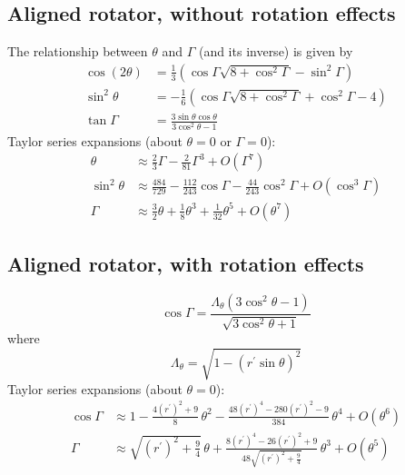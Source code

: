 \documentclass{book}
\begin{document}
\subsection{Aligned rotator, without rotation effects}
The relationship between $\theta$ and $\Gamma$ (and its inverse) is given by \citet{Gangadhara2004}
\begin{equation}
    \begin{aligned}
        \cos(2\theta) &= \frac13\left(\cos\Gamma\sqrt{8 + \cos^2\Gamma} - \sin^2\Gamma\right) \\
        \sin^2\theta  &= -\frac16\left(\cos\Gamma\sqrt{8 + \cos^2\Gamma} + \cos^2\Gamma - 4\right) \\
        \tan\Gamma &= \frac{3\sin\theta\cos\theta}{3\cos^2\theta - 1}
    \end{aligned}
\end{equation}
Taylor series expansions (about $\theta = 0$ or $\Gamma = 0$):
\begin{equation}
    \begin{aligned}
        \theta &\approx \frac23 \Gamma - \frac2{81} \Gamma^3 + O(\Gamma^7) \\
        \sin^2\theta &\approx \frac{484}{729} - \frac{112}{243}\cos\Gamma - \frac{44}{243}\cos^2\Gamma + O(\cos^3\Gamma) \\
        \Gamma &\approx \frac32 \theta + \frac18 \theta^3 + \frac1{32} \theta^5 + O(\theta^7)
    \end{aligned}
\end{equation}

\subsection{Aligned rotator, with rotation effects}
\begin{equation}
    \cos\Gamma = \frac{\Lambda_\theta(3\cos^2\theta-1)}{\sqrt{3\cos^2\theta+1}}
\end{equation}
where
\begin{equation}
    \Lambda_\theta = \sqrt{1 - (r^\prime\sin\theta)^2}
\end{equation}
Taylor series expansions (about $\theta = 0$):
\begin{equation}
    \begin{aligned}
        \cos\Gamma &\approx 1 - \frac{4(r^\prime)^2+9}{8}\,\theta^2 -
                            \frac{48(r^\prime)^4 - 280(r^\prime)^2 - 9}{384}\,\theta^4 + O(\theta^6) \\
        \Gamma &\approx \sqrt{(r^\prime)^2 + \frac94}\,\theta +
                        \frac{8(r^\prime)^4 - 26(r^\prime)^2 + 9}{48\sqrt{(r^\prime)^2 + \frac94}}\,\theta^3 + O(\theta^5)
    \end{aligned}
\end{equation}
\end{document}
